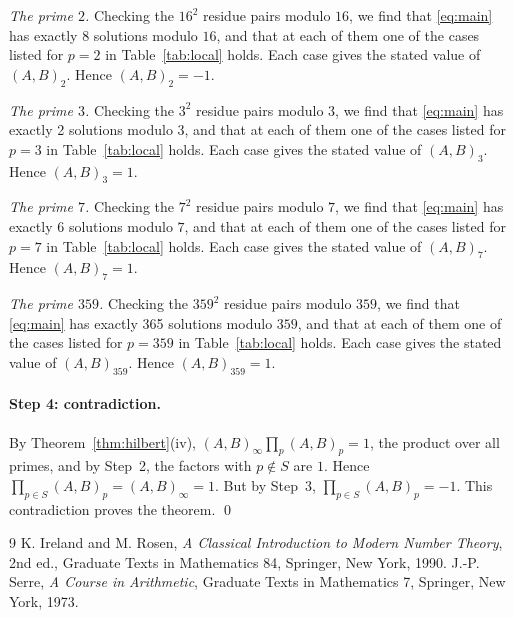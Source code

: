 \documentclass[11pt]{article}
\begin{document}
\emph{The prime $2$.} Checking the $16^2$ residue pairs modulo $16$, we find that \eqref{eq:main} has exactly 8 solutions modulo $16$, and that at each of them one of the cases listed for $p=2$ in Table~\ref{tab:local} holds. Each case gives the stated value of $(A,B)_{2}$. Hence $(A,B)_{2}=-1$.

\emph{The prime $3$.} Checking the $3^2$ residue pairs modulo $3$, we find that \eqref{eq:main} has exactly 2 solutions modulo $3$, and that at each of them one of the cases listed for $p=3$ in Table~\ref{tab:local} holds. Each case gives the stated value of $(A,B)_{3}$. Hence $(A,B)_{3}=1$.

\emph{The prime $7$.} Checking the $7^2$ residue pairs modulo $7$, we find that \eqref{eq:main} has exactly 6 solutions modulo $7$, and that at each of them one of the cases listed for $p=7$ in Table~\ref{tab:local} holds. Each case gives the stated value of $(A,B)_{7}$. Hence $(A,B)_{7}=1$.

\emph{The prime $359$.} Checking the $359^2$ residue pairs modulo $359$, we find that \eqref{eq:main} has exactly 365 solutions modulo $359$, and that at each of them one of the cases listed for $p=359$ in Table~\ref{tab:local} holds. Each case gives the stated value of $(A,B)_{359}$. Hence $(A,B)_{359}=1$.

\paragraph{Step 4: contradiction.} By Theorem~\ref{thm:hilbert}(iv), $(A,B)_\infty\prod_p(A,B)_p=1$, the product over all primes, and by Step~2, the factors with $p\notin S$ are $1$. Hence $\prod_{p\in S}(A,B)_p=(A,B)_\infty=1$. But by Step~3, $\prod_{p\in S}(A,B)_p=-1$. This contradiction proves the theorem.
\qed

\begin{thebibliography}{9}
 K. Ireland and M. Rosen, \emph{A Classical Introduction to Modern Number Theory}, 2nd ed., Graduate Texts in Mathematics 84, Springer, New York, 1990.
 J.-P. Serre, \emph{A Course in Arithmetic}, Graduate Texts in Mathematics 7, Springer, New York, 1973.
\end{thebibliography}
\end{document}
